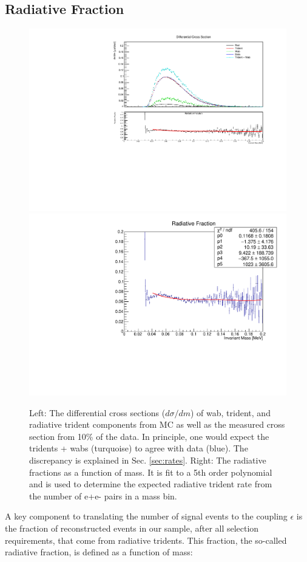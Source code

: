 \clearpage


\subsection{Radiative Fraction} \label{sec:radfrac}

\begin{figure}[t]
    \centering
    \includegraphics[width=.45\textwidth]{figs/recon/radfracall.pdf}
    \includegraphics[width=.45\textwidth]{figs/recon/radfrac.pdf}
    \caption{Left: The differential cross sections ($d\sigma/dm$) of wab, trident, and radiative trident components from MC as well as the measured cross section from 10\% of the data. In principle, one would expect the tridents + wabs (turquoise) to agree with data (blue). The discrepancy is explained in Sec. \ref{sec:rates}. Right: The radiative fractions as a function of mass. It is fit to a 5th order polynomial and is used to determine the expected radiative trident rate from the number of e+e- pairs in a mass bin.}
    \label{fig:radfrac}
\end{figure}

A key component to translating the number of signal events to the coupling $\epsilon$ is the fraction of reconstructed events in our sample, after all selection requirements, that come from radiative tridents.  This fraction, the so-called radiative fraction, is defined as a function of mass:

